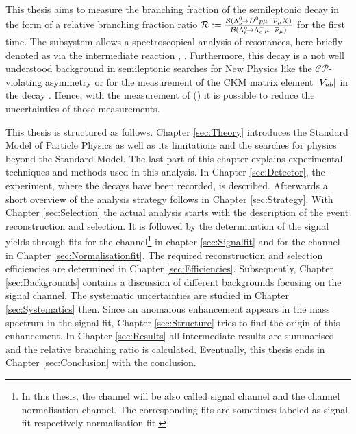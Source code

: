 This thesis aims to measure the branching fraction of the semileptonic decay \LbToDpmunuX in the form of a relative branching fraction ratio $\mathcal{R} := \frac{{\cal B}({{\Lambda}^0_{b}}\!\rightarrow {\ensuremath{{D}^0}}{\ensuremath{p}}{\ensuremath{\mu^-}}{\ensuremath{{\overline{\nu}}_\mu}} X)}{{\cal B}({{\Lambda}^0_{b}}\!\rightarrow {\ensuremath{{\Lambda}^+_{c}}}{\ensuremath{\mu^-}}{\ensuremath{{\overline{\nu}}_\mu}})}$ for the first time.
The \Dz\proton subsystem allows a spectroscopical analysis of \Lc resonances, here briefly denoted as \Lcstar via the intermediate reaction \decay{\Lb}{\Lcstar\mun\neumb}, \decay{\Lcstar}{\Dz\proton}.
Furthermore, this decay is a not well understood background in semileptonic searches for New Physics like the $\mathcal{CP}$-violating asymmetry \asld \cite{asld} or for the measurement of the CKM matrix element $|{V_{{u}{b}}}|$ in the decay \decay{\Lb}{\proton\mun\neumb} \cite{SL_Vub}.
Hence, with the measurement of \BR(\LbToDpmunuX) it is possible to reduce the uncertainties of those measurements.

This thesis is structured as follows.
Chapter \ref{sec:Theory} introduces the Standard Model of Particle Physics as well as its limitations and the searches for physics beyond the Standard Model. The last part of this chapter explains experimental techniques and methods used in this analysis.
In Chapter \ref{sec:Detector}, the \lhcb-experiment, where the decays have been recorded, is described.
Afterwards a short overview of the analysis strategy follows in Chapter \ref{sec:Strategy}.
With Chapter \ref{sec:Selection} the actual analysis starts with the description of the event reconstruction and selection.
It is followed by the determination of the signal yields through fits for the \LbToDpmunuX channel\footnote{In this thesis, the channel \LbToDpmunuX will be also called signal channel and the \LbToLcmunu channel normalisation channel. The corresponding fits are sometimes labeled as signal fit respectively normalisation fit.}
in chapter \ref{sec:Signalfit} and for the \LbToLcmunu channel in Chapter \ref{sec:Normalisationfit}.
The required reconstruction and selection efficiencies are determined in Chapter \ref{sec:Efficiencies}.
Subsequently, Chapter \ref{sec:Backgrounds} contains a discussion of different backgrounds focusing on the \LbToDpmunuX signal channel.
The systematic uncertainties are studied in Chapter \ref{sec:Systematics} then.
Since an anomalous enhancement appears in the \Dz\proton mass spectrum in the signal fit, Chapter \ref{sec:Structure} tries to find the origin of this enhancement.
In Chapter \ref{sec:Results} all intermediate results are summarised and the relative branching ratio \R is calculated.
Eventually, this thesis ends in Chapter \ref{sec:Conclusion} with the conclusion.

